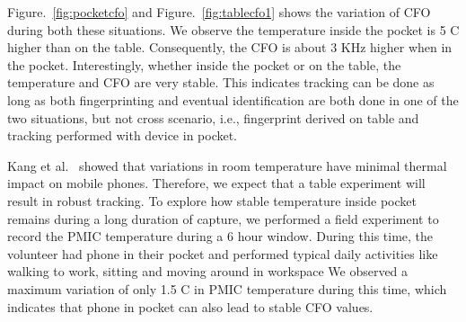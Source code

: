 Figure.~\ref{fig:pocketcfo} and Figure.~\ref{fig:tablecfo1} shows the variation of CFO during both these situations.
%
We observe the temperature inside the pocket is 5 \textdegree C higher than on the table.
%
Consequently, the CFO is about 3 KHz higher when in the pocket.
%
Interestingly, whether inside the pocket or on the table, the temperature and CFO are very stable.
%
This indicates tracking can be done as long as both fingerprinting and eventual identification are both done in one of the two situations, but not cross scenario, i.e., fingerprint derived on table and tracking performed with device in pocket.
%

Kang et al.~\cite{fireinyourhands} showed that variations in room temperature have minimal thermal impact on mobile phones. Therefore, we expect that a table experiment will result in robust tracking. 
%
To explore how stable temperature inside pocket remains during a long duration of capture, we performed a field experiment to record the PMIC temperature during a 6 hour window.
%
During this time, the volunteer had phone in their pocket and performed typical daily activities like walking to work, sitting and moving around in workspace
%
We observed a maximum variation of only 1.5 \textdegree C in PMIC temperature during this time, which indicates that phone in pocket can also lead to stable CFO values.


